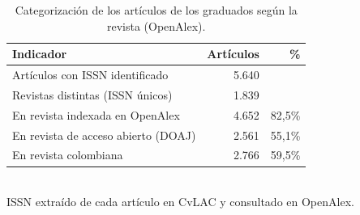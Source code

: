 \begin{table}[H]\centering\footnotesize
\caption{Categorización de los artículos de los graduados según la revista (OpenAlex).}\label{tab:cvlac_revistas}
\begin{tabular}{lrr}
\toprule
\rowcolor{ustaazul}\textbf{\color{white}Indicador} & \textbf{\color{white}Artículos} & \textbf{\color{white}\%} \\
\midrule
Artículos con ISSN identificado & 5.640 &  \\
Revistas distintas (ISSN únicos) & 1.839 &  \\
En revista indexada en OpenAlex & 4.652 & 82,5\% \\
En revista de acceso abierto (DOAJ) & 2.561 & 55,1\% \\
En revista colombiana & 2.766 & 59,5\% \\
\bottomrule
\end{tabular}
\\[2pt]{\scriptsize\color{ustagris} ISSN extraído de cada artículo en CvLAC y consultado en OpenAlex.}
\end{table}